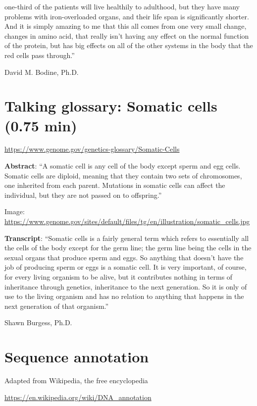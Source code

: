 \documentclass[
]{book}
\begin{document}
one-third of the patients will live healthily to adulthood, but they have many problems with iron-overloaded organs, and their life span is significantly shorter. And it is simply amazing to me that this all comes from one very small change, changes in amino acid, that really isn't having any effect on the normal function of the protein, but has big effects on all of the other systems in the body that the red cells pass through.''

David M. Bodine, Ph.D.

\hypertarget{talking-glossary-somatic-cells-0.75-min}{%
\section{Talking glossary: Somatic cells (0.75 min)}\label{talking-glossary-somatic-cells-0.75-min}}

\url{https://www.genome.gov/genetics-glossary/Somatic-Cells}

\textbf{Abstract}: ``A somatic cell is any cell of the body except sperm and egg cells. Somatic cells are diploid, meaning that they contain two sets of chromosomes, one inherited from each parent. Mutations in somatic cells can affect the individual, but they are not passed on to offspring.''

Image: \url{https://www.genome.gov/sites/default/files/tg/en/illustration/somatic_cells.jpg}

\textbf{Transcript}: ``Somatic cells is a fairly general term which refers to essentially all the cells of the body except for the germ line; the germ line being the cells in the sexual organs that produce sperm and eggs. So anything that doesn't have the job of producing sperm or eggs is a somatic cell. It is very important, of course, for every living organism to be alive, but it contributes nothing in terms of inheritance through genetics, inheritance to the next generation. So it is only of use to the living organism and has no relation to anything that happens in the next generation of that organism.''

Shawn Burgess, Ph.D.

\hypertarget{sequence-annotation}{%
\section{Sequence annotation}\label{sequence-annotation}}

Adapted from Wikipedia, the free encyclopedia

\url{https://en.wikipedia.org/wiki/DNA_annotation}
\end{document}
